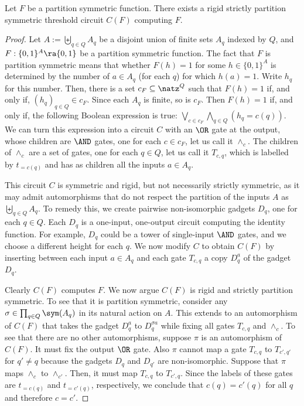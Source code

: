\documentclass{toc}
\begin{document}
\begin{lemma}
  Let $F$ be a partition symmetric function. There exists a rigid strictly
  partition symmetric threshold circuit $C(F)$ computing $F$.
  \label{lem:partition-symmetric}
\end{lemma}
\begin{proof}
  Let $A := \biguplus_{q \in Q}A_q$ be a disjoint union of finite sets $A_q$
  indexed by $Q$, and $F : \{0, 1\}^A \ra \{0, 1\}$ be a partition symmetric
  function. The fact that $F$ is partition symmetric means that whether $F(h) =
  1$ for some $h \in \{0,1\}^A$ is determined by the number of $a \in A_q$ (for
  each $q$) for which $h(a) = 1$. Write $h_q$ for this number. Then, there is a
  set $c_F \subseteq \natz^Q$ such that $F(h) = 1$ if, and only if, $(h_q)_{q\in
    Q} \in c_F$. Since each $A_q$ is finite, so is $c_F$. Then $F(h) = 1$ if,
  and only if, the following Boolean expression is true: $\bigvee_{c \in
    c_F}\bigwedge_{q\in Q} (h_q = c(q)).$ We can turn this expression into a
  circuit $C$ with an $\OR$ gate at the output, whose children are $\AND$ gates,
  one for each $c \in c_F$, let us call it $\land_c$. The children of $\land_c$
  are a set of gates, one for each $q \in Q$, let us call it $T_{c,q}$, which is
  labelled by $t_{=c(q)}$ and has as children all the inputs $a \in A_q$.

  This circuit $C$ is symmetric and rigid, but not necessarily strictly
  symmetric, as it may admit automorphisms that do not respect the partition of
  the inputs $A$ as $\biguplus_{q \in Q}A_q$. To remedy this, we create pairwise
  non-isomorphic gadgets $D_q$, one for each $q \in Q$. Each $D_q$ is a
  one-input, one-output circuit computing the identity function. For example,
  $D_q$ could be a tower of single-input $\AND$ gates, and we choose a different
  height for each $q$. We now modify $C$ to obtain $C(F)$ by inserting between
  each input $a \in A_q$ and each gate $T_{c,q}$ a copy $D^a_q$ of the gadget
  $D_q$.

  Clearly $C(F)$ computes $F$. We now argue $C(F)$ is rigid and strictly partition
  symmetric. To see that it is partition symmetric, consider any $\sigma \in \prod_{q \in
    Q}\sym(A_q)$ in its natural action on $A$. This extends to an automorphism
  of $C(F)$ that takes the gadget $D^a_q$ to $D^{\sigma a}_q$ while fixing all
  gates $T_{c,q}$ and $\land_c$. To see that there are no other automorphisms,
  suppose $\pi$ is an automorphism of $C(F)$. It must fix the output $\OR$ gate.
  Also $\pi$ cannot map a gate $T_{c,q}$ to $T_{c',q'}$ for $q'\neq q$ because
  the gadgets $D_q$ and $D_{q'}$ are non-isomorphic. Suppose that $\pi$ maps
  $\land_c$ to $\land_{c'}$. Then, it must map $T_{c,q}$ to $T_{c',q}$. Since
  the labels of these gates are $t_{=c(q)}$ and $t_{=c'(q)}$, %
respectively, we
  conclude that $c(q) = c'(q)$ for all $q$ and therefore $c=c'$.
\end{proof}
\end{document}
